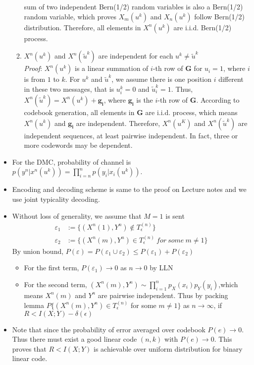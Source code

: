 \documentclass[12]{article}
\begin{document}
\begin{itemize}
\begin{enumerate}
				sum of two independent Bern(1/2) random variables is also a Bern(1/2) random variable,
				which proves $X_m(u^k)$ and $X_n(u^k)$ follow Bern(1/2) distribution. Therefore, all
				elements in $X^n(u^k)$ are i.i.d. Bern(1/2) process.
			\item $X^n(u^k)$ and $X^n(\tilde{u}^k)$ are independent for each $u^k\neq\tilde{u}^k$\\
				\emph{Proof}: $X^n(u^k)$ is a linear summation of $i$-th row of $\mathbf{G}$ for 
				$u_i=1$, where $i$ is from $1$ to $k$. For $u^k$ and $\tilde{u}^k$, we assume there is
				one position $i$ different in these two messages, that is $u^k_i=0$ and $\tilde{u}^k_i=1$.
				Thus, $X^n(\tilde{u}^k)=X^n(u^k)+\mathbf{g_i}$, where $\mathbf{g_i}$ is the $i$-th row
				of $\mathbf{G}$. According to codebook generation, all elements in $\mathbf{G}$ are i.i.d.
				process, which means $X^n(u^k)$ and $\mathbf{g_i}$ are independent. Therefore, $
				X^n(u^K)$ and $X^n(\tilde{u}^k)$ are independent sequences, at least pairwise independent.
				In fact, three or more codewords may be dependent.
		\end{enumerate}
	\item For the DMC, probability of channel is $p(y^n|x^n(u^k))=\prod_{i=n}^{n}p(y_i|x_i(u^k))$.
	\item Encoding and decoding scheme is same to the proof on Lecture notes and we use joint typicality decoding.
	\item Without loss of generality, we assume that $M=1$ is sent
		\begin{equation*}
			\begin{split}
				\varepsilon_1&:=\{(X^n(1),Y^n)\not\in T^{(n)}_\epsilon\}\\
				\varepsilon_2&:=\{(X^n(m),Y^n)\in T^{(n)}_\epsilon~for~some~m\neq1\}
		\end{split}
		\end{equation*}
		By union bound, $P(\varepsilon)=P(\varepsilon_1\cup\varepsilon_2)\leq P(\varepsilon_1)
		+P(\varepsilon_2)$
		\begin{itemize}
			\item For the first term, $P(\varepsilon_1)\rightarrow0$ as $n\rightarrow0$ by LLN
			\item For the second term, $(X^n(m),Y^n)\sim\prod^n_{i=1}p_X(x_i)p_Y(y_i)$,which means $X^n(m)$
				and $Y^n$ are pairwise independent. Thus by packing lemma
				$P\{(X^n(m),Y^n)\in T^{(n)}_\epsilon$ for some $m\neq1\}$ as $n\rightarrow\infty$, if
				$R<I(X;Y)-\delta(\epsilon)$
		\end{itemize}
	\item Note that since the probability of error averaged over codebook $P(e)\rightarrow0$.
		Thus there must exist a good linear code $(n,k)$ with $P(e)\rightarrow0$. This proves that $R<I(X;Y)$ is
		achievable over uniform distribution for binary linear code.
\end{itemize}
\end{document}
